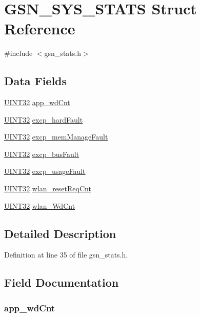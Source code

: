 \hypertarget{a00260}{
\section{GSN\_\-SYS\_\-STATS Struct Reference}
\label{a00260}
}


{\ttfamily \#include $<$gsn\_\-stats.h$>$}

\subsection*{Data Fields}
\begin{DoxyCompactItemize}
\item 
\hyperlink{a00660_gae1e6edbbc26d6fbc71a90190d0266018}{UINT32} \hyperlink{a00260_a8aa3ad79f5676ee2ca06e1a7309b5144}{app\_\-wdCnt}
\item 
\hyperlink{a00660_gae1e6edbbc26d6fbc71a90190d0266018}{UINT32} \hyperlink{a00260_a1b0106c510c59343efffe347a0af9aea}{excp\_\-hardFault}
\item 
\hyperlink{a00660_gae1e6edbbc26d6fbc71a90190d0266018}{UINT32} \hyperlink{a00260_adbb342849bf2af6c867ea746445f203e}{excp\_\-memManageFault}
\item 
\hyperlink{a00660_gae1e6edbbc26d6fbc71a90190d0266018}{UINT32} \hyperlink{a00260_abe2cd45ef7d42e875409b0db31b4febb}{excp\_\-busFault}
\item 
\hyperlink{a00660_gae1e6edbbc26d6fbc71a90190d0266018}{UINT32} \hyperlink{a00260_a0428f166d18bd40f3a8cd5131e116c0b}{excp\_\-usageFault}
\item 
\hyperlink{a00660_gae1e6edbbc26d6fbc71a90190d0266018}{UINT32} \hyperlink{a00260_a54d7c806a50fbf511fa3268ea308d70e}{wlan\_\-resetReqCnt}
\item 
\hyperlink{a00660_gae1e6edbbc26d6fbc71a90190d0266018}{UINT32} \hyperlink{a00260_acb73acc03334be77902872ab54921303}{wlan\_\-WdCnt}
\end{DoxyCompactItemize}


\subsection{Detailed Description}


Definition at line 35 of file gsn\_\-stats.h.



\subsection{Field Documentation}
\hypertarget{a00260_a8aa3ad79f5676ee2ca06e1a7309b5144}{
\subsubsection[{app\_\-wdCnt}]{ {\bf app\_\-wdCnt}}}
\label{a00260_a8aa3ad79f5676ee2ca06e1a7309b5144}



